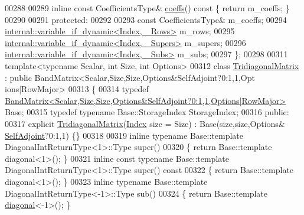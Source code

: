 \begin{DoxyCode}
00288 
00289     \textcolor{keyword}{inline} \textcolor{keyword}{const} CoefficientsType& \hyperlink{class_eigen_1_1internal_1_1_band_matrix_base_ab7c9e9a7ca5ad0f2f3a82ac582650499}{coeffs}()\textcolor{keyword}{ const }\{ \textcolor{keywordflow}{return} m\_coeffs; \}
00290 
00291   \textcolor{keyword}{protected}:
00292 
00293     \textcolor{keyword}{const} CoefficientsType& m\_coeffs;
00294     \hyperlink{class_eigen_1_1internal_1_1variable__if__dynamic}{internal::variable\_if\_dynamic<Index, \_Rows>}   m\_rows;
00295     \hyperlink{class_eigen_1_1internal_1_1variable__if__dynamic}{internal::variable\_if\_dynamic<Index, \_Supers>} m\_supers;
00296     \hyperlink{class_eigen_1_1internal_1_1variable__if__dynamic}{internal::variable\_if\_dynamic<Index, \_Subs>}   m\_subs;
00297 \};
00298 
00311 \textcolor{keyword}{template}<\textcolor{keyword}{typename} Scalar, \textcolor{keywordtype}{int} Size, \textcolor{keywordtype}{int} Options>
00312 \textcolor{keyword}{class }\hyperlink{group___core___module_class_eigen_1_1internal_1_1_tridiagonal_matrix}{TridiagonalMatrix} : \textcolor{keyword}{public} BandMatrix<Scalar,Size,Size,Options&SelfAdjoint?0:1,1,Opt
      ions|RowMajor>
00313 \{
00314     \textcolor{keyword}{typedef} 
      \hyperlink{group___core___module}{BandMatrix<Scalar,Size,Size,Options&SelfAdjoint?0:1,1,Options|RowMajor>}
       Base;
00315     \textcolor{keyword}{typedef} \textcolor{keyword}{typename} Base::StorageIndex StorageIndex;
00316   \textcolor{keyword}{public}:
00317     \textcolor{keyword}{explicit} \hyperlink{group___core___module_class_eigen_1_1internal_1_1_tridiagonal_matrix}{TridiagonalMatrix}(\hyperlink{namespace_eigen_a62e77e0933482dafde8fe197d9a2cfde}{Index} size = Size) : Base(size,size,Options&
      \hyperlink{group__enums_gga39e3366ff5554d731e7dc8bb642f83cda2491fc6765056421f504eb7e16083e8f}{SelfAdjoint}?0:1,1) \{\}
00318 
00319     \textcolor{keyword}{inline} \textcolor{keyword}{typename} Base::template DiagonalIntReturnType<1>::Type super()
00320     \{ \textcolor{keywordflow}{return} Base::template diagonal<1>(); \}
00321     \textcolor{keyword}{inline} \textcolor{keyword}{const} \textcolor{keyword}{typename} Base::template DiagonalIntReturnType<1>::Type super()\textcolor{keyword}{ const}
00322 \textcolor{keyword}{    }\{ \textcolor{keywordflow}{return} Base::template diagonal<1>(); \}
00323     \textcolor{keyword}{inline} \textcolor{keyword}{typename} Base::template DiagonalIntReturnType<-1>::Type sub()
00324     \{ \textcolor{keywordflow}{return} Base::template \hyperlink{class_eigen_1_1internal_1_1_band_matrix_base_abce1c4d69e72ec594f67a841d1040606}{diagonal}<-1>(); \}

\end{DoxyCode}

